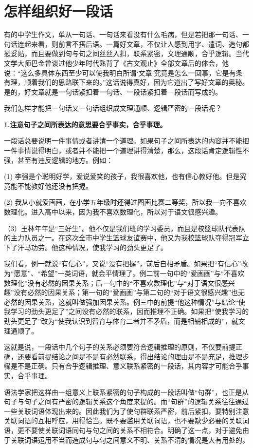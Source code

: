 \section{怎样组织好一段话}

有的中学生作文，单从一句话、一句话来看没有什么毛病，但是若把那一句话、一句话连起来看，则前言不搭后语。一篇好文章，不仅让人感到用字、遣词、造句都挺妥贴，而且要做到句与句之间丝丝入扣，联系紧密，文理通顺，合乎逻辑。当代文学大师巴金曾谈过他少年时代熟背了《古文观止》全部文章后的体会，他说：“这么多具体东西至少可以使我明白所谓‘文章’究竟是怎么一回事，它是有条有理，顺着我们的思路联下来的。”这话说得真好，因为它道出了写好文章的奥秘。是的，好文章就是一句话紧扣着一句话、一段话紧扣着—段话而写成的。

我们怎样才能把一句话又一句话组织成文理通顺、逻辑严密的一段话呢？

\textbf{1.注意句子之间所表达的意思要合乎事实，合乎事理。}

一段话总要说明一件事情或者讲清一个道理。如果句子之间所表达的内容并不能把一件事情说得明白，或者并不能把一个道理讲得清楚，那么，这段话肯定逻辑性不强，甚至有违反逻辑的地方。例如：
\newpage

(1) 李强是个聪明好学，爱说爱笑的孩子，我很喜欢他，也有信心教好他。但是究竟能不能教好他还没有把握。

(2) 我从小就爱画画，在小学五年级时还得过图画比赛二等奖，所以我一向不喜欢数理化。进入高中以来，因为我不喜欢数理化，所以对于语文很感兴趣。

（3）王林年年是“三好生”。他不仅是我们班的学习委员，而且是校篮球队代表队的主力队员之一。在这次全市中学生篮球友谊赛中，他又为我校篮球队夺得冠军立下了汗马功劳。他这种情况，使我学习的劲头更足了。

我们看，例一就说“有信心”，又说“没有把握”，前后自相矛盾。如果把“有信心”改为“愿意”、“希望”一类词语，就会平情理了。例二前一句中的“爱画画”与“不喜欢数理化”没有必然的因果关系；后一句中的“不喜欢数理化”与“对于语文很感兴趣”没有必然的因果关系；第一句的“爱画画”与第二句的“对于语文很感兴趣”也无必然的因果关系，这就叫做强加因果关系。例三中的前提“他这种情况”与结论“使我学习的劲头更足了”之间没有必然的联系，因而推理不正确。如果把“使我学习的劲头更足了”改为“使我认识到智育与体育二者并不矛盾，而是相辅相成的”，就文理通顺了。

这就是说，一段话中几个句子的关系必须要符合逻辑推理的原则，不仅要前提正确，还要看前提结论之间是不是有必然联系，得出结论的理由是不是充足，推理步骤是不是正确。只有合乎逻辑推理、意义联系紧密的一段话，其内容才可能合乎事实，合乎事理。

语法学家把这样由一组意义上联系紧密的句子构成的一段话叫做“句群”，也正是从句子与句子之间有严密的逻辑关系这个角度来提的。而“句群”的逻辑关系往往通过一些关联词语体现出来的。因此我们为了使句群联系严密，前后紧扣，要特别注意关联词语的互相呼应，用得恰当。既不要滥用关联词语，也不要缺少必要的关联词语，更不要使关联词语同句与句之间的关系不相符合。明确了这一点，对于避免由于关联词语运用不当而造成句与句之间意义不明、关系不清的情况是大有用处的。

